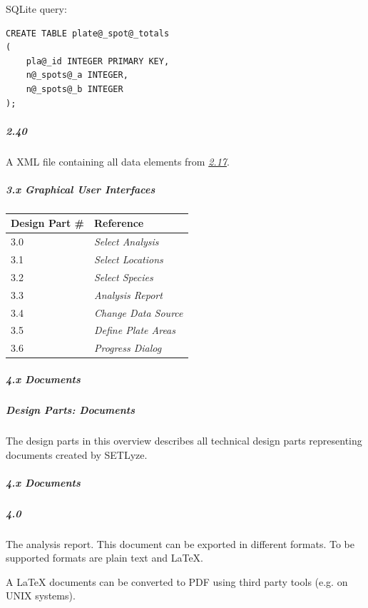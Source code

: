 \documentclass[letterpaper,10pt,english]{sphinxmanual}
\begin{document}
SQLite query:

\begin{Verbatim}[commandchars=@\[\]]
CREATE TABLE plate@_spot@_totals
(
    pla@_id INTEGER PRIMARY KEY,
    n@_spots@_a INTEGER,
    n@_spots@_b INTEGER
);
\end{Verbatim}


\subparagraph{2.40}
\label{design_parts_data:id47}
A XML file containing all data elements from {\hyperref[design_parts_data:design-part-data-2-17]{\emph{2.17}}}.


\subparagraph{3.x Graphical User Interfaces}
\label{design_parts_index:x-graphical-user-interfaces}
\begin{tabulary}{\linewidth}{|L|L|}
\hline
\textbf{
Design Part \#
} & \textbf{
Reference
}\\
\hline

3.0
 & 
\emph{Select Analysis}
\\

3.1
 & 
\emph{Select Locations}
\\

3.2
 & 
\emph{Select Species}
\\

3.3
 & 
\emph{Analysis Report}
\\

3.4
 & 
\emph{Change Data Source}
\\

3.5
 & 
\emph{Define Plate Areas}
\\

3.6
 & 
\emph{Progress Dialog}
\\
\hline
\end{tabulary}



\subparagraph{4.x Documents}
\label{design_parts_index:x-documents}

\subparagraph{Design Parts: Documents}
\label{design_parts_docs:design-parts-documents}\label{design_parts_docs::doc}
The design parts in this overview describes all technical design parts
representing documents created by SETLyze.


\subparagraph{4.x Documents}
\label{design_parts_docs:x-documents}

\subparagraph{4.0}
\label{design_parts_docs:design-part-docs-4-0}\label{design_parts_docs:id1}
The analysis report. This document can be exported in different formats.
To be supported formats are plain text and LaTeX.

A LaTeX documents can be converted to PDF using third party tools (e.g.
 on UNIX systems).
\end{document}
